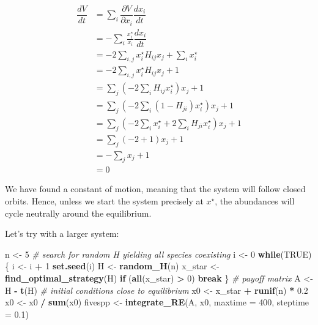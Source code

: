 \documentclass[]{book}
\newenvironment{Shaded}{\begin{snugshade}}{\end{snugshade}}
\newcommand{\CommentTok}[1]{\textcolor[rgb]{0.56,0.35,0.01}{\textit{#1}}}
\newcommand{\ControlFlowTok}[1]{\textcolor[rgb]{0.13,0.29,0.53}{\textbf{#1}}}
\newcommand{\DataTypeTok}[1]{\textcolor[rgb]{0.13,0.29,0.53}{#1}}
\newcommand{\DecValTok}[1]{\textcolor[rgb]{0.00,0.00,0.81}{#1}}
\newcommand{\FloatTok}[1]{\textcolor[rgb]{0.00,0.00,0.81}{#1}}
\newcommand{\KeywordTok}[1]{\textcolor[rgb]{0.13,0.29,0.53}{\textbf{#1}}}
\newcommand{\NormalTok}[1]{#1}
\newcommand{\OperatorTok}[1]{\textcolor[rgb]{0.81,0.36,0.00}{\textbf{#1}}}
\newcommand{\OtherTok}[1]{\textcolor[rgb]{0.56,0.35,0.01}{#1}}
\newcommand{\StringTok}[1]{\textcolor[rgb]{0.31,0.60,0.02}{#1}}
\begin{document}
\[
\begin{aligned}
  \dfrac{d V}{d t} &= \sum_i \dfrac{\partial V}{\partial x_i}
  \dfrac{d x_i}{d t}\\
  &= - \sum_i \frac{x_i^\star}{x_i} \dfrac{d x_i}{d t} \\
  &= -2 \sum_{i,j} x_i^\star H_{ij}x_j + \sum_i x_i^\star\\
  &= -2 \sum_{i,j} x_i^\star H_{ij}x_j + 1\\
  &= \sum_j \left(-2 \sum_i H_{ij}x_i^\star \right) x_j + 1\\
  &= \sum_j \left(-2 \sum_i (1 - H_{ji}) x_i^\star \right) x_j + 1\\
  &= \sum_j \left(-2 \sum_i x_i^\star + 2 \sum_i H_{ji} x_i^\star \right) x_j
  + 1 \\
  &= \sum_j \left(-2 + 1 \right) x_j  + 1 \\
  &=- \sum_j x_j + 1\\
  &= 0 
\end{aligned}
\]

We have found a constant of motion, meaning that the system will follow closed orbits. Hence, unless we start the system precisely at \(x^\star\), the abundances will cycle neutrally around the equilibrium.

Let's try with a larger system:

\begin{Shaded}
\begin{Highlighting}[]
\NormalTok{n <-}\StringTok{ }\DecValTok{5}
\CommentTok{# search for random H yielding all species coexisting}
\NormalTok{i <-}\StringTok{ }\DecValTok{0}
\ControlFlowTok{while}\NormalTok{(}\OtherTok{TRUE}\NormalTok{)\{}
\NormalTok{  i <-}\StringTok{ }\NormalTok{i }\OperatorTok{+}\StringTok{ }\DecValTok{1}
  \KeywordTok{set.seed}\NormalTok{(i)}
\NormalTok{  H <-}\StringTok{ }\KeywordTok{random_H}\NormalTok{(n)}
\NormalTok{  x_star <-}\StringTok{ }\KeywordTok{find_optimal_strategy}\NormalTok{(H)}
  \ControlFlowTok{if}\NormalTok{ (}\KeywordTok{all}\NormalTok{(x_star) }\OperatorTok{>}\StringTok{ }\DecValTok{0}\NormalTok{) }\ControlFlowTok{break}
\NormalTok{\}}
\CommentTok{# payoff matrix}
\NormalTok{A <-}\StringTok{ }\NormalTok{H }\OperatorTok{-}\StringTok{ }\KeywordTok{t}\NormalTok{(H)}
\CommentTok{# initial conditions close to equilibrium}
\NormalTok{x0 <-}\StringTok{ }\NormalTok{x_star }\OperatorTok{+}\StringTok{ }\KeywordTok{runif}\NormalTok{(n) }\OperatorTok{*}\StringTok{ }\FloatTok{0.2}
\NormalTok{x0 <-}\StringTok{ }\NormalTok{x0 }\OperatorTok{/}\StringTok{ }\KeywordTok{sum}\NormalTok{(x0)}
\NormalTok{fivespp <-}\StringTok{ }\KeywordTok{integrate_RE}\NormalTok{(A, x0, }\DataTypeTok{maxtime =} \DecValTok{400}\NormalTok{, }\DataTypeTok{steptime =} \FloatTok{0.1}\NormalTok{)}
\end{Highlighting}
\end{Shaded}
\end{document}
